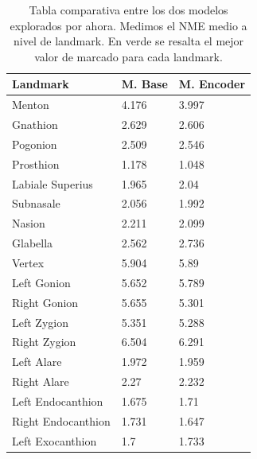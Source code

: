        \begin{table}[!ht]
            \centering
            \caption{Tabla comparativa entre los dos modelos explorados por ahora. Medimos el NME medio a nivel de landmark. En verde se resalta el mejor valor de marcado para cada landmark.}
            \begin{tabular}{|l|l|l|}
            \hline
            \cellcolor{gray!25}\textbf{Landmark} & \cellcolor{gray!25}\textbf{M. Base} & \cellcolor{gray!25}\textbf{M. Encoder} \\ \hline
                Menton & 4.176 & \cellcolor{green!25}3.997 \\ \hline
                Gnathion & 2.629 & \cellcolor{green!25}2.606 \\ \hline
                Pogonion & \cellcolor{green!25}2.509 & 2.546 \\ \hline
                Prosthion & 1.178 & \cellcolor{green!25}1.048 \\ \hline
                Labiale Superius & \cellcolor{green!25}1.965 & 2.04 \\ \hline
                Subnasale & 2.056 & \cellcolor{green!25}1.992 \\ \hline
                Nasion & 2.211 & \cellcolor{green!25}2.099 \\ \hline
                Glabella & \cellcolor{green!25}2.562 & 2.736 \\ \hline
                \cellcolor{yellow!50}Vertex &\cellcolor{yellow!50} 5.904 & \cellcolor{yellow!50}5.89 \\ \hline
                Left Gonion & \cellcolor{green!25}5.652 & 5.789 \\ \hline
                Right Gonion & 5.655 & \cellcolor{green!25}5.301 \\ \hline
                Left Zygion & 5.351 & \cellcolor{green!25}5.288 \\ \hline
                Right Zygion & 6.504 & \cellcolor{green!25}6.291 \\ \hline
                Left Alare & 1.972 & \cellcolor{green!25}1.959 \\ \hline
                Right Alare & 2.27 & \cellcolor{green!25}2.232 \\ \hline
                Left Endocanthion & \cellcolor{green!25}1.675 & 1.71 \\ \hline
                Right Endocanthion & 1.731 & \cellcolor{green!25}1.647 \\ \hline
                Left Exocanthion & \cellcolor{green!25}1.7 & 1.733 \\ \hline

\end{tabular}
\end{table}
